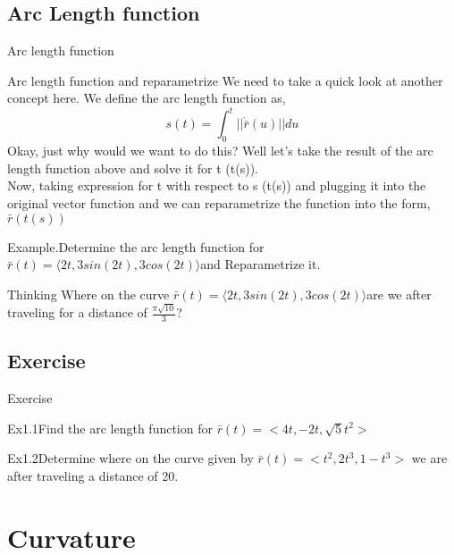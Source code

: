 \documentclass{beamer}
\begin{document}
    \subsection{Arc Length function}
    \begin{frame}[t]{Arc length function}
        \begin{block}{Arc length function and reparametrize}
            We need to take a quick look at another concept here. We define the arc length function as,
            \begin{equation*}
                s(t) = \int_{0}^{t}{||\dot{\bar{r}}(u)||du}
            \end{equation*}
            Okay, just why would we want to do this? Well let’s take the result of the arc length function above and solve it for t (t(s)).\\
            Now, taking expression for t with respect to s (t(s)) and plugging it into the original vector function and we can \textcolor{yy}{reparametrize} the function into the form, $\bar{r}(t(s))$
        \end{block}
        \par \textcolor{yy}{Example.}Determine the arc length function for $\bar{r}(t)=⟨2t,3sin(2t),3cos(2t)⟩$and Reparametrize it.\\
        \par \textcolor{yy}{Thinking} Where on the curve $\bar{r}(t)=⟨2t,3sin(2t),3cos(2t)⟩$are we after traveling for a distance of $\frac{\pi\sqrt{10}}{3}$?
    \end{frame}

    
\subsection{Exercise}
    \begin{frame}[t]{Exercise}
    \par \textcolor{yy}{Ex1.1}Find the arc length function for $\bar{r}(t) = <4t,-2t,\sqrt{5}t^2>$
    \par \textcolor{yy}{Ex1.2}Determine where on the curve given by $\bar{r}(t) = <t^2,2t^3,1-t^3>$ we are after traveling a distance of 20.
       
    \end{frame}



\section{Curvature}
    
\end{document}
